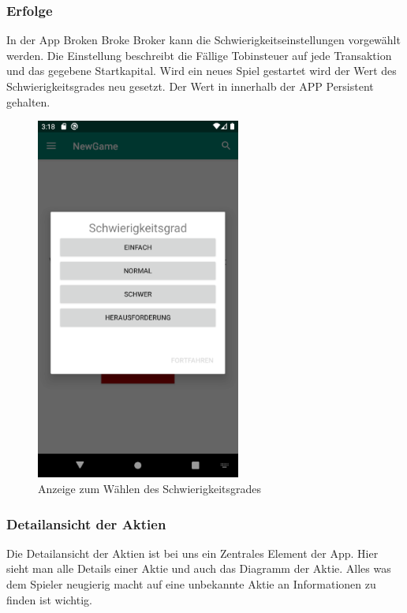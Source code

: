\documentclass[10pt]{scrartcl}
\begin{document}
	\subsubsection{Erfolge}
	In der App Broken Broke Broker kann die Schwierigkeitseinstellungen vorgewählt werden. Die Einstellung beschreibt die Fällige Tobinsteuer auf jede Transaktion und das gegebene Startkapital. Wird ein neues Spiel gestartet wird der Wert des Schwierigkeitsgrades neu gesetzt. Der Wert in innerhalb der APP Persistent gehalten.
	\begin{figure}[H]
		\centering
		\includegraphics[width=0.6\textwidth]{Bilder/Prsi/diff.png}
		\caption{Anzeige zum Wählen des Schwierigkeitsgrades}
	\end{figure}
	 
	\subsubsection{Detailansicht der Aktien}
	Die Detailansicht der Aktien ist bei uns ein Zentrales Element der App. Hier sieht man alle Details einer Aktie und auch das Diagramm der Aktie. Alles was dem Spieler neugierig macht auf eine unbekannte Aktie an Informationen zu finden ist wichtig.
	
\end{document}
